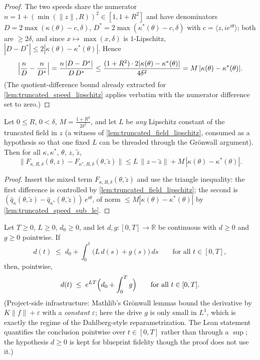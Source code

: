 \begin{proof}

\leanok
  The two speeds share the numerator $n=1+(\min(\|z\|,R))^2\in[1,1+R^2]$ and have
  denominators $D=2\max(\kappa(\theta)-c,\delta)$, $D^\ast=2\max(\kappa^\ast(\theta)-c,
  \delta)$ with $c=\langle z,ie^{i\theta}\rangle$; both are $\ge2\delta$, and since
  $x\mapsto\max(x,\delta)$ is $1$-Lipschitz, $|D-D^\ast|\le2|\kappa(\theta)-
  \kappa^\ast(\theta)|$. Hence
  \[
    \Bigl|\frac nD-\frac n{D^\ast}\Bigr|
    =\frac{n\,|D-D^\ast|}{D\,D^\ast}
    \le\frac{(1+R^2)\cdot2|\kappa(\theta)-\kappa^\ast(\theta)|}{4\delta^2}
    =M\,|\kappa(\theta)-\kappa^\ast(\theta)| .
  \]
  (The quotient-difference bound already extracted for
  \cref{lem:truncated_speed_lipschitz} applies verbatim with the numerator difference
  set to zero.)
\end{proof}
\begin{lemma}
  \label{lem:truncated_field_sub_le}
  Let $0\le R$, $0<\delta$, $M=\tfrac{1+R^2}{2\delta^2}$, and let $L$ be \emph{any}
  Lipschitz constant of the truncated field in $z$ (a witness of
  \cref{lem:truncated_field_lipschitz}, consumed as a hypothesis so that one fixed $L$
  can be threaded through the Gr\"onwall argument). Then for all $\kappa,\kappa^\ast$,
  $\theta$, $z$, $\tilde z$,
  \[
    \|F_{\kappa,R,\delta}(\theta,z)-F_{\kappa^\ast,R,\delta}(\theta,\tilde z)\|
    \le L\,\|z-\tilde z\|+M\,|\kappa(\theta)-\kappa^\ast(\theta)| .
  \]
\end{lemma}

\begin{proof}

\leanok
  Insert the mixed term $F_{\kappa,R,\delta}(\theta,\tilde z)$ and use the triangle
  inequality: the first difference is controlled by
  \cref{lem:truncated_field_lipschitz}; the second is
  $(\hat q_{\kappa}(\theta,\tilde z)-\hat q_{\kappa^\ast}(\theta,\tilde z))\,e^{i\theta}$,
  of norm $\le M|\kappa(\theta)-\kappa^\ast(\theta)|$ by
  \cref{lem:truncated_speed_sub_le}.
\end{proof}

\begin{lemma}
  \label{lem:gronwall_L1_drive}
  Let $T\ge0$, $L\ge0$, $d_0\ge0$, and let $d,g:[0,T]\to\mathbb R$ be continuous with
  $d\ge0$ and $g\ge0$ pointwise. If
  \[
    d(t)\;\le\;d_0+\int_0^t\bigl(L\,d(s)+g(s)\bigr)\,ds
    \qquad\text{for all }t\in[0,T],
  \]
  then, pointwise,
  \[
    d(t)\;\le\;e^{LT}\Bigl(d_0+\int_0^T g\Bigr)\qquad\text{for all }t\in[0,T] .
  \]
  (Project-side infrastructure: Mathlib's Gr\"onwall lemmas bound the derivative by
  $K\|f\|+\varepsilon$ with a \emph{constant} $\varepsilon$; here the drive $g$ is only
  small in $L^1$, which is exactly the regime of the Dahlberg-style reparametrization.
  The Lean statement quantifies the conclusion pointwise over $t\in[0,T]$ rather than
  through a $\sup$; the hypothesis $d\ge0$ is kept for blueprint fidelity though the
  proof does not use it.)
\end{lemma}

